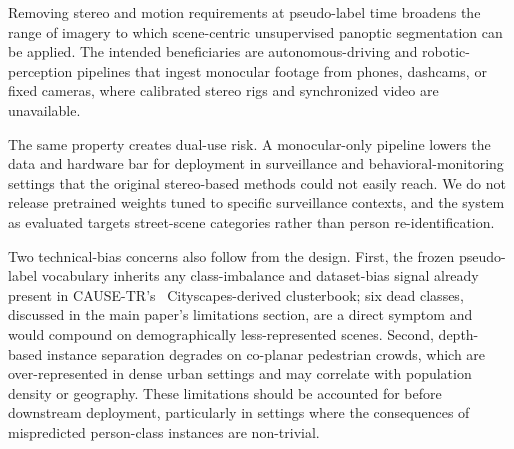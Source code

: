 \documentclass{article}
\begin{document}
\noindent Removing stereo and motion requirements at pseudo-label time broadens the range of imagery to which scene-centric unsupervised panoptic segmentation can be applied. The intended beneficiaries are autonomous-driving and robotic-perception pipelines that ingest monocular footage from phones, dashcams, or fixed cameras, where calibrated stereo rigs and synchronized video are unavailable.

The same property creates dual-use risk. A monocular-only pipeline lowers the data and hardware bar for deployment in surveillance and behavioral-monitoring settings that the original stereo-based methods could not easily reach. We do not release pretrained weights tuned to specific surveillance contexts, and the system as evaluated targets street-scene categories rather than person re-identification.

Two technical-bias concerns also follow from the design. First, the frozen pseudo-label vocabulary inherits any class-imbalance and dataset-bias signal already present in CAUSE-TR's~\cite{kim2024cause} Cityscapes-derived clusterbook; six dead classes, discussed in the main paper's limitations section, are a direct symptom and would compound on demographically less-represented scenes. Second, depth-based instance separation degrades on co-planar pedestrian crowds, which are over-represented in dense urban settings and may correlate with population density or geography. These limitations should be accounted for before downstream deployment, particularly in settings where the consequences of mispredicted person-class instances are non-trivial.
\end{document}
